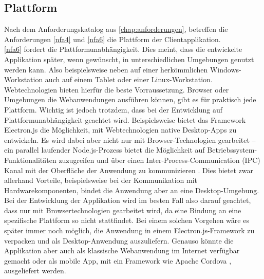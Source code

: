 \subsection{Plattform}
\label{subs:plattform}

Nach dem Anforderungskatalog aus \autoref{chap:anforderungen}, betreffen die Anforderungen
\ref{nfa4} und \ref{nfa6} die Plattform der Clientapplikation.\\

\ref{nfa6} fordert die Plattformunabhängigkeit. Dies meint, dass die entwickelte
Applikation später, wenn gewünscht, in unterschiedlichen Umgebungen genutzt werden kann.
Also beispielsweise neben auf einer herkömmlichen Windows-Workstation auch auf einem
Tablet oder einer Linux-Workstation. Webtechnologien bieten hierfür die beste Vorraussetzung. 
Browser oder Umgebungen die Webanwendungen ausführen können, gibt es für praktisch 
jede Plattform. Wichtig ist jedoch trotzdem, dass bei der Entwicklung auf
Plattformunabhängigkeit geachtet wird. Beispielsweise bietet das Framework Electron.js die 
Möglichkeit, mit Webtechnologien native Desktop-Apps zu entwickeln. Es wird dabei aber nicht
nur mit Browser-Technologien gearbeitet -- ein parallel laufender Node.js-Prozess bietet
die Möglichkeit auf Betriebssystem-Funktionalitäten zuzugreifen 
und über einen Inter-Process-Communication (IPC) Kanal mit der Oberfläche der Anwendung zu
kommunizieren \cite{electron-architecture}. Dies bietet zwar allerhand Vorteile, beispielsweise bei der Kommunikation
mit Hardwarekomponenten, bindet die Anwendung aber an eine Desktop-Umgebung. 
Bei der Entwicklung der Applikation wird im besten Fall also darauf geachtet, dass nur mit 
Browsertechnologien gearbeitet wird, da eine Bindung an eine spezifische Plattform so 
nicht stattfindet. Bei einem solchen Vorgehen wäre es später immer noch möglich, 
die Anwendung in einem Electron.js-Framework zu verpacken und als Desktop-Anwendung auszuliefern. 
Genauso könnte die Applikation aber auch als klassische Webanwendung im Internet verfügbar gemacht oder 
als mobile App, mit ein Framework wie Apache Cordova \cite{cordova}, ausgeliefert werden.\\

